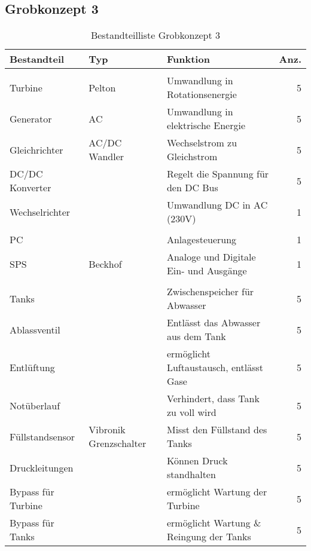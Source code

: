\subsection{Grobkonzept 3} \label{subsec:grobkonzept3}
\begin{table}[H]
\small
\begin{tabular}{>{\HY\RaggedRight}p{3cm} >{\HY\RaggedRight}p{3.6cm} >{\HY\RaggedRight}p{6.9cm} r}
\hline
\textbf{Bestandteil}&\textbf{Typ}&\textbf{Funktion}&\textbf{Anz.}\\
\hline

\rowcolor{hellgrau}
\multicolumn{4}{l}{\textbf{Stromerzeugung}}\T\\
Turbine&Pelton&Umwandlung in Rotationsenergie&5\\
Generator&AC&Umwandlung in elektrische Energie&5\\
Gleichrichter&AC/DC Wandler&Wechselstrom zu Gleichstrom&5\\
DC/DC Konverter&&Regelt die Spannung für den DC Bus&5\\
Wechselrichter&&Umwandlung DC in AC (230V)&1\B\\

\rowcolor{hellgrau}
\multicolumn{4}{l}{\textbf{Kontrollsystem}}\T\\
PC&&Anlagesteuerung&1\\
SPS&Beckhof&Analoge und Digitale Ein- und Ausgänge&1\B\\

\rowcolor{hellgrau}
\multicolumn{4}{l}{\textbf{Abwassertechnik}}\T\\
Tanks&&Zwischenspeicher für Abwasser&5\\
Ablassventil&&Entlässt das Abwasser aus dem Tank&5\\
Entlüftung&&ermöglicht Luftaustausch, entlässt Gase&5\\
Notüberlauf&&Verhindert, dass Tank zu voll wird&5\\
Füllstandsensor&Vibronik Grenzschalter&Misst den Füllstand des Tanks&5\\
Druckleitungen&&Können Druck standhalten&5\\
Bypass für Turbine&&ermöglicht Wartung der Turbine&5\\
Bypass für Tanks&&ermöglicht Wartung \& Reingung der Tanks&5\B\\ 
\hline
\end{tabular}
\caption{Bestandteilliste Grobkonzept 3}\label{tab:BLGrobkonzept3}
\end{table}
